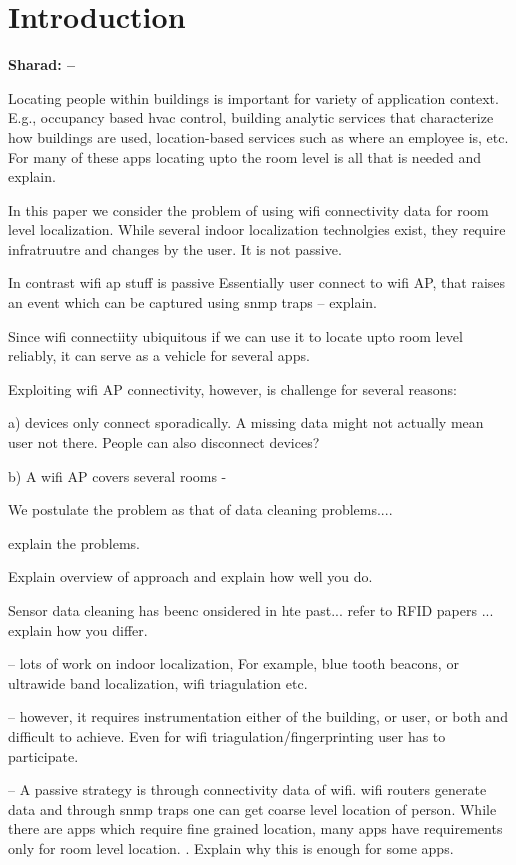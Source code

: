\section{Introduction}
\label{sec:intro}

{\bf Sharad:
-- 
 
Locating people within buildings is
important for variety of application context. E.g., occupancy based hvac control, building analytic services
that characterize how buildings are used, location-based services such as
where an employee is, etc. For many of
these apps locating upto the room level is all that is needed \cite{} and explain.

In this paper we consider the problem of using wifi connectivity data for room level localization. While several indoor localization technolgies exist, they require infratruutre and changes by the user. It is not passive.

In contrast wifi ap stuff is passive 
 Essentially user connect to wifi AP, that raises an event which  can be captured using snmp traps -- explain.

Since wifi connectiity  ubiquitous if we can use it to locate upto room level reliably, it can serve as a vehicle for
several apps.

Exploiting wifi AP connectivity, however, is challenge for several reasons:

a) devices only connect sporadically. A missing data might not actually mean user not there. People can also disconnect devices?

b) A wifi AP covers several rooms -

We postulate the problem as that of data cleaning problems.... 

explain the problems.

Explain overview of approach and explain how well you do.

Sensor data cleaning has beenc onsidered in hte past... refer to RFID papers ... explain how you differ.

}


-- lots of work on indoor localization, 
For example, blue tooth beacons, or ultrawide band localization, wifi triagulation etc. 

-- however, it requires instrumentation either of the building, or user, or both and difficult to achieve. Even for
wifi triagulation/fingerprinting user has to participate.

-- A passive strategy is through connectivity data of wifi. wifi routers generate data and through snmp traps one can get coarse level location of person. While there are apps which require fine grained location, many apps have requirements only for room level location. \cite{give references}. Explain why this is enough for some apps.

